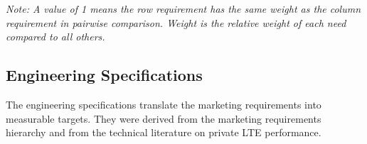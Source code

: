 \documentclass[
    left=1.5in,
    right=1.25in,
    top=1.25in,
    bottom=1.25in
]{CalPolySeniorProject}
\begin{document}
\begin{table}[!ht]
    \centering
    \caption[Pairwise marketing requirements weighting]{Pairwise marketing
    requirements weighting.}
    \vspace{0.5\baselineskip}
    \label{tab:pairwise}
\end{table}

\noindent\textit{Note: A value of 1 means the row requirement has the same
weight as the column requirement in pairwise comparison. Weight is the relative
weight of each need compared to all others.}

\subsection{Engineering Specifications}

The engineering specifications translate the marketing requirements into
measurable targets. They were derived from the marketing requirements hierarchy
and from the technical literature on private LTE performance.
\end{document}

